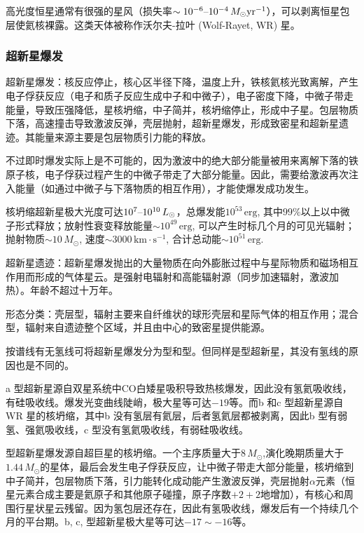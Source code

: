 \documentclass[../天体物理基础.tex]{subfiles}
\begin{document}
高光度恒星通常有很强的星风（损失率$\sim10^{-6}\text{\textendash}10^{-4}\,M_{\odot}\mathrm{yr}^{-1}$），可以剥离恒星包层使氦核裸露。这类天体被称作沃尔夫{}-{}拉叶 (Wolf-Rayet, WR) 星。

\subsubsection{超新星爆发}

超新星爆发：核反应停止，核心区半径下降，温度上升，铁核氦核光致离解，产生电子俘获反应（电子和质子反应生成中子和中微子），电子密度下降，中微子带走能量，导致压强降低，星核坍缩，中子简并，核坍缩停止，形成中子星。包层物质下落，高速撞击导致激波反弹，壳层抛射，超新星爆发，形成致密星和超新星遗迹。其能量来源主要是包层物质引力能的释放。

不过即时爆发实际上是不可能的，因为激波中的绝大部分能量被用来离解下落的铁原子核，电子俘获过程产生的中微子带走了大部分能量。因此，需要给激波再次注入能量（如通过中微子与下落物质的相互作用），才能使爆发成功发生。

核坍缩超新星极大光度可达$10^{7}\text{\textendash}10^{10}\,L_{\odot}$，总爆发能$10^{53}\,\mathrm{erg}$, 其中$99\%$以上以中微子形式释放；放射性衰变释放能量$\sim10^{49}\,\mathrm{erg}$, 可以产生时标几个月的可见光辐射；抛射物质$\sim10\,M_{\odot}$, 速度$\sim3000\,\mathrm{km\cdot{}s^{-1}}$, 合计总动能$\sim10^{51}\,\mathrm{erg}$.

超新星遗迹：超新星爆发抛出的大量物质在向外膨胀过程中与星际物质和磁场相互作用而形成的气体星云。是强射电辐射和高能辐射源（同步加速辐射，激波加热）。年龄不超过十万年。

形态分类：壳层型，辐射主要来自纤维状的球形壳层和星际气体的相互作用；混合型，辐射来自遗迹整个区域，并且由中心的致密星提供能源。

按谱线有无氢线可将超新星爆发分为\uppercase\expandafter{}型和\uppercase\expandafter{}型。但同样是\uppercase\expandafter{}型超新星，其没有氢线的原因也是不同的。

\uppercase\expandafter{}a 型超新星源自双星系统中$\mathrm{CO}$白矮星吸积导致热核爆发，因此没有氢氦吸收线，有硅吸收线。爆发光变曲线陡峭，极大星等可达$-19$等。而\uppercase\expandafter{}b 和\uppercase\expandafter{}c 型超新星源自 WR 星的核坍缩，其中\uppercase\expandafter{}b 没有氢层有氦层，后者氢氦层都被剥离，因此\uppercase\expandafter{}b 型有弱氢、强氦吸收线，\uppercase\expandafter{}c 型没有氢氦吸收线，有弱硅吸收线。

\uppercase\expandafter{}型超新星爆发源自超巨星的核坍缩。一个主序质量大于$8\,M_{\odot}$,演化晚期质量大于$1.44\,M_{\odot}$的星体，最后会发生电子俘获反应，让中微子带走大部分能量，核坍缩到中子简并，包层物质下落，引力能转化成动能产生激波反弹，壳层抛射$\alpha$元素（恒星元素合成主要是氦原子和其他原子碰撞，原子序数$+2+2$地增加），有核心和周围行星状星云残留。因为氢包层还存在，因此有氢吸收线，爆发后有一个持续几个月的平台期。\uppercase\expandafter{}b, \uppercase\expandafter{}c, \uppercase\expandafter{}型超新星极大星等可达$-17\sim-16$等。
\end{document}
